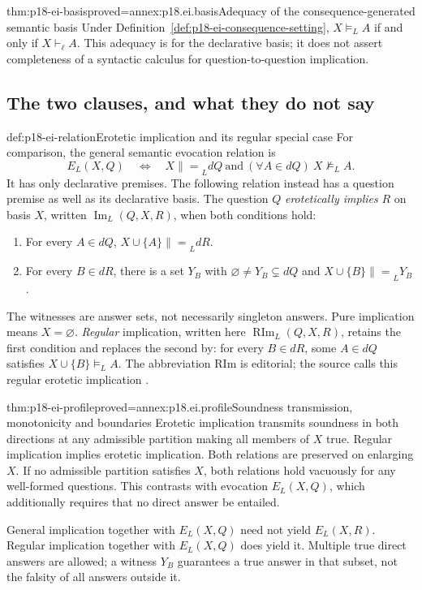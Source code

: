 \begin{hbtheorem}{thm:p18-ei-basis}{proved=annex:p18.ei.basis}{Adequacy of the consequence-generated semantic basis}
Under Definition~\ref{def:p18-ei-consequence-setting},
\(X\models_L A\) if and only if \(X\vdash_\ell A\).
This adequacy is for the declarative basis; it does not assert completeness
of a syntactic calculus for question-to-question implication.
\end{hbtheorem}

\subsection{The two clauses, and what they do not say}

\begin{hbdefinition}{def:p18-ei-relation}{Erotetic implication and its regular special case}
For comparison, the general semantic evocation relation is
\[
 E_L(X,Q)\quad\Longleftrightarrow\quad
 X\mathrel{\|=}_L dQ\ \text{and}\
 (\forall A\in dQ)\ X\not\models_L A.
\]
It has only declarative premises. The following relation instead has a
question premise as well as its declarative basis.
The question \(Q\) \emph{erotetically implies} \(R\) on basis \(X\),
written \(\operatorname{Im}_L(Q,X,R)\), when both conditions hold:
\begin{enumerate}
\item For every \(A\in dQ\), \(X\cup\{A\}\mathrel{\|=}_L dR\).
\item For every \(B\in dR\), there is a set \(Y_B\) with
\(\varnothing\ne Y_B\subsetneq dQ\) and
\(X\cup\{B\}\mathrel{\|=}_L Y_B\).
\end{enumerate}
The witnesses are answer sets, not necessarily singleton answers. Pure
implication means \(X=\varnothing\). \emph{Regular} implication,
written here \(\operatorname{RIm}_L(Q,X,R)\), retains the first condition
and replaces the second by: for every \(B\in dR\), some \(A\in dQ\)
satisfies \(X\cup\{B\}\models_L A\). The abbreviation RIm is editorial;
the source calls this regular erotetic implication
\cite[pp.~23--26]{Wisniewski2001QuestionsInferences}.
\end{hbdefinition}

\begin{hbtheorem}{thm:p18-ei-profile}{proved=annex:p18.ei.profile}{Soundness transmission, monotonicity and boundaries}
Erotetic implication transmits soundness in both directions at any admissible
partition making all members of \(X\) true. Regular implication implies
erotetic implication. Both relations are preserved on enlarging \(X\).
If no admissible partition satisfies \(X\), both relations hold vacuously
for any well-formed questions. This contrasts with evocation
\(E_L(X,Q)\), which additionally requires that no direct answer be entailed.

General implication together with \(E_L(X,Q)\) need not yield
\(E_L(X,R)\). Regular implication together with \(E_L(X,Q)\) does yield it.
Multiple true direct answers are allowed; a witness \(Y_B\) guarantees a
true answer in that subset, not the falsity of all answers outside it.
\end{hbtheorem}

